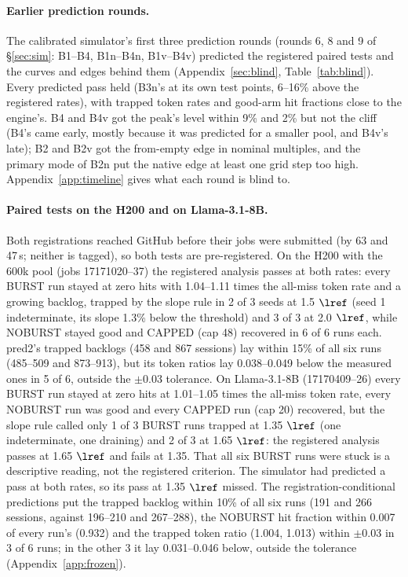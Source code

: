 \paragraph{Earlier prediction rounds.} The calibrated simulator's first three prediction rounds (rounds 6, 8 and 9 of \S\ref{sec:sim}: B1--B4, B1n--B4n, B1v--B4v) predicted the registered paired tests and the curves and edges behind them (Appendix~\ref{sec:blind}, Table~\ref{tab:blind}). Every predicted pass held (B3n's at its own test points, 6--16\% above the registered rates), with trapped token rates and good-arm hit fractions close to the engine's. B4 and B4v got the peak's level within 9\% and 2\% but not the cliff (B4's came early, mostly because it was predicted for a smaller pool, and B4v's late); B2 and B2v got the from-empty edge in nominal multiples, and the primary mode of B2n put the native edge at least one grid step too high. Appendix~\ref{app:timeline} gives what each round is blind to.

\paragraph{Paired tests on the H200 and on Llama-3.1-8B.} Both registrations reached GitHub before their jobs were submitted (by 63 and 47\,s; neither is tagged), so both tests are pre-registered. On the H200 with the 600k pool (jobs 17171020--37) the registered analysis passes at both rates: every BURST run stayed at zero hits with 1.04--1.11 times the all-miss token rate and a growing backlog, trapped by the slope rule in 2 of 3 seeds at 1.5 $\lref$ (seed 1 indeterminate, its slope 1.3\% below the threshold) and 3 of 3 at 2.0 $\lref$, while NOBURST stayed good and CAPPED (cap 48) recovered in 6 of 6 runs each. pred2's trapped backlogs (458 and 867 sessions) lay within 15\% of all six runs (485--509 and 873--913), but its token ratios lay 0.038--0.049 below the measured ones in 5 of 6, outside the $\pm0.03$ tolerance. On Llama-3.1-8B (17170409--26) every BURST run stayed at zero hits at 1.01--1.05 times the all-miss token rate, every NOBURST run was good and every CAPPED run (cap 20) recovered, but the slope rule called only 1 of 3 BURST runs trapped at 1.35 $\lref$ (one indeterminate, one draining) and 2 of 3 at 1.65 $\lref$: the registered analysis passes at 1.65 $\lref$ and fails at 1.35. That all six BURST runs were stuck is a descriptive reading, not the registered criterion. The simulator had predicted a pass at both rates, so its pass at 1.35 $\lref$ missed. The registration-conditional predictions put the trapped backlog within 10\% of all six runs (191 and 266 sessions, against 196--210 and 267--288), the NOBURST hit fraction within 0.007 of every run's (0.932) and the trapped token ratio (1.004, 1.013) within $\pm0.03$ in 3 of 6 runs; in the other 3 it lay 0.031--0.046 below, outside the tolerance (Appendix~\ref{app:frozen}).

